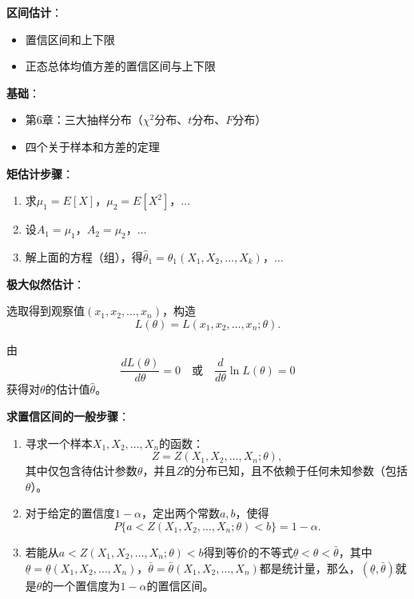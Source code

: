\documentclass[11pt,a4paper]{report}
\theoremstyle{definition}
\begin{document}
\textbf{区间估计}：
\begin{itemize}[leftmargin=2em]
    \item 置信区间和上下限
    \item 正态总体均值方差的置信区间与上下限
\end{itemize}

\textbf{基础}：
\begin{itemize}[leftmargin=2em]
    \item 第6章：三大抽样分布（$\chi^{2}$分布、$t$分布、$F$分布）
    \item 四个关于样本和方差的定理
\end{itemize}

\textbf{矩估计步骤}：
\begin{enumerate}[label=\arabic*.,leftmargin=2em]
    \item 求$\mu_{1}=E[X]$，$\mu_{2}=E[X^{2}]$，$\ldots$
    \item 设$A_{1}=\mu_{1}$，$A_{2}=\mu_{2}$，$\ldots$
    \item 解上面的方程（组），得$\hat{\theta}_{1}=\hat{\theta}_{1}(X_{1},X_{2},\ldots,X_{k})$，$\ldots$
\end{enumerate}

\textbf{极大似然估计}：

选取得到观察值$(x_{1},x_{2},\ldots,x_{n})$，构造
\[
L(\theta)=L(x_{1},x_{2},\ldots,x_{n};\theta).
\]

由
\[
\frac{dL(\theta)}{d\theta}=0\quad\text{或}\quad\frac{d}{d\theta}\ln L(\theta)=0
\]
获得对$\theta$的估计值$\hat{\theta}$。

\textbf{求置信区间的一般步骤}：
\begin{enumerate}[label=\arabic*.,leftmargin=2em]
    \item 寻求一个样本$X_{1},X_{2},\ldots,X_{n}$的函数：
    \[
    Z=Z(X_{1},X_{2},\ldots,X_{n};\theta),
    \]
    其中仅包含待估计参数$\theta$，并且$Z$的分布已知，且不依赖于任何未知参数（包括$\theta$）。
    \item 对于给定的置信度$1-\alpha$，定出两个常数$a,b$，使得
    \[
    P\{a<Z(X_{1},X_{2},\ldots,X_{n};\theta)<b\}=1-\alpha.
    \]
    \item 若能从$a<Z(X_{1},X_{2},\ldots,X_{n};\theta)<b$得到等价的不等式$\underline{\theta}<\theta<\bar{\theta}$，其中$\underline{\theta}=\underline{\theta}(X_{1},X_{2},\ldots,X_{n})$，$\bar{\theta}=\bar{\theta}(X_{1},X_{2},\ldots,X_{n})$都是统计量，那么，$(\underline{\theta},\bar{\theta})$就是$\theta$的一个置信度为$1-\alpha$的置信区间。
\end{enumerate}
\end{document}
